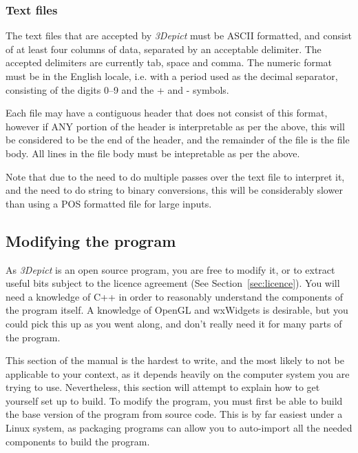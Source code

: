 \documentclass[10pt]{article}
\begin{document}
\subsubsection{Text files}
\label{sec:textformat}
The text files that are accepted by \emph{3Depict} must be ASCII formatted, and consist of at least four columns of data, separated by an acceptable delimiter. The accepted delimiters are currently tab, space and comma. The numeric format must be in the English locale, i.e. with a period used as the decimal separator, consisting of the digits 0--9 and the + and - symbols.

Each file may have a contiguous header that does not consist of this format, however if ANY portion of the header is interpretable as per the above, this will be considered to be the end of the header, and the remainder of the file is the file body. All lines in the file body must be intepretable as per the above.  

Note that due to the need to do multiple passes over the text file to interpret it, and the need to do string to binary conversions, this will be considerably slower than using a POS formatted file for large inputs.

\subsection{Modifying the program}

As \emph{3Depict} is an open source program, you are free to modify it, or to extract useful bits subject to the licence agreement (See Section~\ref{sec:licence}). You will need a knowledge of C++ in order to reasonably understand the components of the program itself. A knowledge of OpenGL and wxWidgets is desirable, but you could pick this up as you went along, and don't really need it for many parts of the program.

This section of the manual is the hardest to write, and the most likely to not be applicable to your context, as it depends heavily on the computer system you are trying to use. Nevertheless, this section will attempt to explain how to get yourself set up to build. To modify the program, you must first be able to build the base version of the program from source code. This is by far easiest under a Linux system, as packaging programs can allow you to auto-import all the needed components to build the program.
\end{document}
